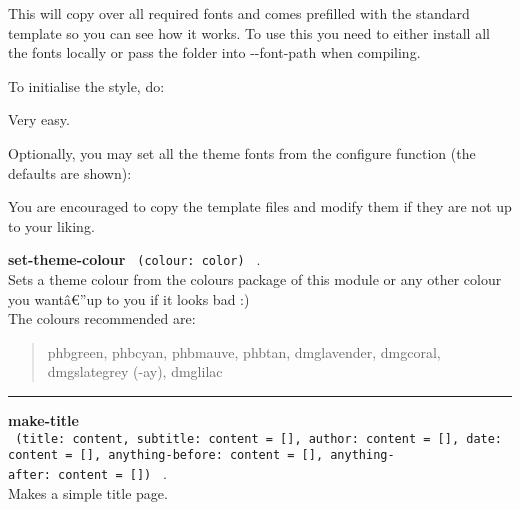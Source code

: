 This will copy over all required fonts and comes prefilled with the
standard template so you can see how it works. To use this you need to
either install all the fonts locally or pass the folder into
-\/-font-path when compiling.

To initialise the style, do:

\begin{Shaded}
\begin{Highlighting}[]

\end{Highlighting}
\end{Shaded}

Very easy.

Optionally, you may set all the theme fonts from the configure function
(the defaults are shown):

\begin{Shaded}
\begin{Highlighting}[]

\NormalTok{) }
\end{Highlighting}
\end{Shaded}

You are encouraged to copy the template files and modify them if they
are not up to your liking.

\textbf{set-theme-colour} \texttt{\ (colour:\ color)\ } .\\
Sets a theme colour from the colours package of this module or any other
colour you wantâ€''up to you if it looks bad :)\\
The colours recommended are:

\begin{quote}
phbgreen, phbcyan, phbmauve, phbtan, dmglavender, dmgcoral, dmgslategrey
(-ay), dmglilac
\end{quote}

\begin{center}\rule{0.5\linewidth}{0.5pt}\end{center}

\textbf{make-title}
\texttt{\ (title:\ content,\ subtitle:\ content\ =\ {[}{]},\ author:\ content\ =\ {[}{]},\ date:\ content\ =\ {[}{]},\ anything-before:\ content\ =\ {[}{]},\ anything-after:\ content\ =\ {[}{]})\ }
.\\
Makes a simple title page.

